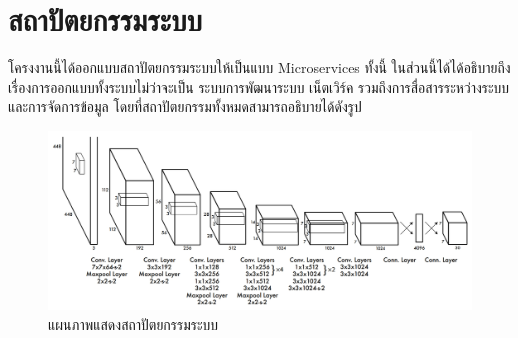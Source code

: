 \section{สถาปัตยกรรมระบบ}
โครงงานนี้ได้ออกแบบสถาปัตยกรรมระบบให้เป็นแบบ Microservices ทั้งนี้ ในส่วนนี้ได้ได้อธิบายถึงเรื่องการออกแบบทั้งระบบไม่ว่าจะเป็น ระบบการพัฒนาระบบ เน็ตเวิร์ค รวมถึงการสื่อสารระหว่างระบบ และการจัดการข้อมูล โดยที่สถาปัตยกรรมทั้งหมดสามารถอธิบายได้ดังรูป
\begin{figure}[ht]
    \begin{center}
    \includegraphics[scale=0.2]{resources/YOLO.png}
    \end{center}
    \caption[System Architecture]{แผนภาพแสดงสถาปัตยกรรมระบบ}
    \label{fig:system-architecture}
  \end{figure}
